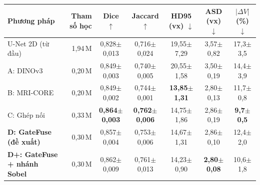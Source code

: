 \begin{tabular}{lrccccc}
\toprule
Phương pháp & Tham số học & Dice $\uparrow$ & Jaccard $\uparrow$ & HD95 (vx) $\downarrow$ & ASD (vx) $\downarrow$ & $|\Delta V|$ (\%) $\downarrow$\\
\midrule
U-Net 2D (từ đầu) & 1{,}94\,M & 0{,}828{\scriptsize$\pm$0{,}013} & 0{,}716{\scriptsize$\pm$0{,}024} & 19{,}55{\scriptsize$\pm$7{,}29} & 3{,}57{\scriptsize$\pm$0{,}82} & 17{,}3{\scriptsize$\pm$3{,}5}\\
A: DINOv3 & 0{,}20\,M & 0{,}849{\scriptsize$\pm$0{,}003} & 0{,}740{\scriptsize$\pm$0{,}005} & 20{,}55{\scriptsize$\pm$1{,}58} & 3{,}50{\scriptsize$\pm$0{,}19} & 14{,}4{\scriptsize$\pm$3{,}9}\\
B: MRI-CORE & 0{,}20\,M & 0{,}849{\scriptsize$\pm$0{,}002} & 0{,}744{\scriptsize$\pm$0{,}001} & \textbf{13{,}85{\scriptsize$\pm$1{,}31}} & 2{,}80{\scriptsize$\pm$0{,}13} & 11{,}7{\scriptsize$\pm$0{,}8}\\
C: Ghép nối & 0{,}33\,M & \textbf{0{,}864{\scriptsize$\pm$0{,}003}} & \textbf{0{,}762{\scriptsize$\pm$0{,}006}} & 14{,}75{\scriptsize$\pm$1{,}86} & 2{,}86{\scriptsize$\pm$0{,}19} & \textbf{9{,}7{\scriptsize$\pm$0{,}5}}\\
\textbf{D: GateFuse (đề xuất)} & 0{,}30\,M & 0{,}857{\scriptsize$\pm$0{,}004} & 0{,}753{\scriptsize$\pm$0{,}006} & 14{,}67{\scriptsize$\pm$1{,}31} & 2{,}86{\scriptsize$\pm$0{,}10} & 12{,}4{\scriptsize$\pm$2{,}0}\\
\textbf{D+: GateFuse + nhánh Sobel} & 0{,}30\,M & 0{,}862{\scriptsize$\pm$0{,}009} & 0{,}761{\scriptsize$\pm$0{,}013} & 14{,}23{\scriptsize$\pm$0{,}90} & \textbf{2{,}80{\scriptsize$\pm$0{,}08}} & 10{,}6{\scriptsize$\pm$1{,}8}\\
\bottomrule
\end{tabular}